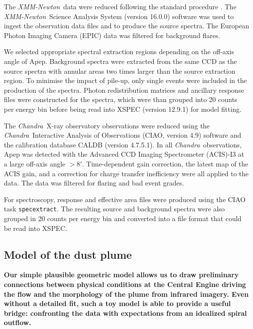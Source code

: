 \documentclass[preprint,times]{aastex61}
\newcommand{\xmm}{\emph{XMM-Newton}}
\newcommand{\chan}{\emph{Chandra}}
\begin{document}
The \xmm~data were reduced following the standard procedure \citep{Callingham2012}. The \xmm~Science Analysis System (version 16.0.0) software was used to ingest the observation data files and to produce the source spectra. The European Photon Imaging Camera (EPIC) data was filtered for background flares.

We selected appropriate spectral extraction regions depending on the off-axis angle of Apep. Background spectra were extracted from the same CCD as the source spectra with annular areas two times larger than the source extraction region. To minimise the impact of pile-up, only single events were included in the production of the spectra. Photon redistribution matrices and ancillary response files were constructed for the spectra, which were than grouped into 20 counts per energy bin before being read into XSPEC (version 12.9.1) \citep{Arnaud1996} for model fitting. 

The \chan~X-ray observatory observations were reduced using the \chan~Interactive Analysis of Observations (CIAO, version 4.9) software and the calibration database CALDB (version 4.7.5.1). In all \chan~observations, Apep was detected with the Advanced CCD Imaging Spectrometer (ACIS)-I3 at a large off-axis angle $>8'$. Time-dependent gain correction, the latest map of the ACIS gain, and a correction for charge transfer inefficiency were all applied to the data. The data was filtered for flaring and bad event grades.

For spectroscopy, response and effective area files were produced using the CIAO task {\tt specextract}. The resulting source and background spectra were also grouped in 20 counts per energy bin and converted into a file format that could be read into XSPEC. 

\subsection{Model of the dust plume} \label{sec:model_dust_plume}

\textbf{Our simple plausible geometric model allows us to draw preliminary connections between physical conditions at the Central Engine driving the flow and the morphology of the plume from infrared imagery. Even without a detailed fit, such a toy model is able to provide a useful bridge: confronting the data with expectations from an idealized spiral outflow.}
\end{document}
